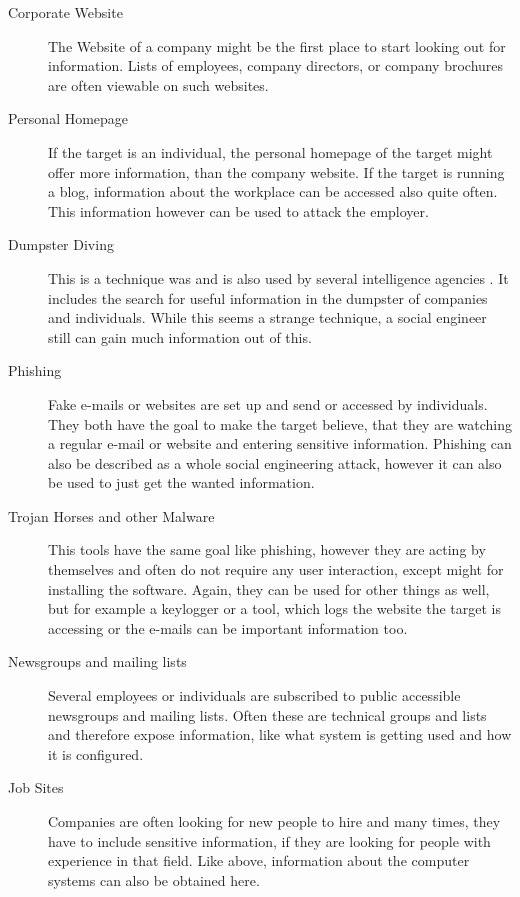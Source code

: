 \begin{description}

\item[Corporate Website] The Website of a company might be the first place to
  start looking out for information. Lists of employees,
  company directors, or company brochures are often viewable on such websites. 
\item[Personal Homepage] If the target is an individual, the personal homepage
  of the target might offer more information, than the company website. If the
  target is running a blog, information about the workplace can be accessed
  also quite often. This information however can be used to attack the
  employer.
\item[Dumpster Diving] This is a technique was and is also used by several
  intelligence agencies \cite{lively2003}. It includes the search
  for useful information in the dumpster of companies and individuals. While
  this seems a strange technique, a social engineer still can gain much
  information out of this.
\item[Phishing] Fake e-mails or websites are set up and send or accessed by
  individuals. They both have the goal to make the target believe, that they are
  watching a regular e-mail or website and entering sensitive information.
  Phishing can also be described as a whole social engineering attack, however
  it can also be used to just get the wanted information.
\item[Trojan Horses and other Malware] This tools have the same goal like
  phishing, however they are acting by themselves and often do not require any
  user interaction, except might for installing the software. Again, they can
  be used for other things as well, but for example a keylogger or a tool,
  which logs the website the target is accessing or the e-mails can be
  important information too.
\item[Newsgroups and mailing lists] Several employees or individuals are
  subscribed to public accessible newsgroups and mailing lists. Often these are
  technical groups and lists and therefore expose information, like what system
  is getting used and how it is configured.
\item[Job Sites] Companies are often looking for new people to hire and many
  times, they have to include sensitive information, if they are looking for
  people with experience in that field. Like above, information about the
  computer systems can also be obtained here.
\end{description}

